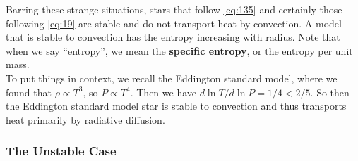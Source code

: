 \documentclass[10pt]{article}
\numberwithin{equation}{section}
\newcommand{\n}{\noindent}
\begin{document}
\n Barring these strange situations, stars that follow \eqref{eq:135}
and certainly those following \eqref{eq:19} are stable and do not transport heat by
convection. A model that is stable to convection has the entropy
increasing with radius. Note that when we say ``entropy'', we mean the
\textbf{specific entropy}, or the entropy per unit mass.\\

\n To put things in context, we recall the Eddington standard model,
where we found that $\rho\propto T^3$, so $P\propto T^4$. Then we have
$d\ln T/d\ln P=1/4<2/5$. So then the Eddington standard model star is
stable to convection and thus transports heat primarily by radiative
diffusion.
\subsubsection{The Unstable Case}
\label{sec:unstable-case}
\end{document}
